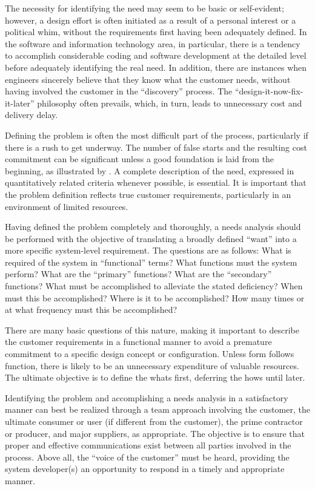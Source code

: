 The necessity for identifying the need may seem to be basic or self-evident; however, a design effort is often initiated as a result of a personal interest or a political whim, without the requirements first having been adequately defined. In the software and information technology area, in particular, there is a tendency to accomplish considerable coding and software development at the detailed level before adequately identifying the real need. In addition, there are instances when engineers sincerely believe that they know what the customer needs, without having involved the customer in the ``discovery'' process. The ``design-it-now-fix-it-later'' philosophy often prevails, which, in turn, leads to unnecessary cost and delivery delay.

Defining the problem is often the most difficult part of the process, particularly if there is a rush to get underway. The number of false starts and the resulting cost commitment can be significant unless a good foundation is laid from the beginning, as illustrated by . A complete description of the need, expressed in quantitatively related criteria whenever possible, is essential. It is important that the problem definition reflects true customer requirements, particularly in an environment of limited resources.

Having defined the problem completely and thoroughly, a needs analysis should be performed with the objective of translating a broadly defined ``want'' into a more specific system-level requirement. The questions are as follows: What is required of the system in ``functional'' terms? What functions must the system perform? What are the ``primary'' functions? What are the ``secondary'' functions? What must be accomplished to alleviate the stated deficiency? When must this be accomplished? Where is it to be accomplished? How many times or at what frequency must this be accomplished?

There are many basic questions of this nature, making it important to describe the customer requirements in a functional manner to avoid a premature commitment to a specific design concept or configuration. Unless form follows function, there is likely to be an unnecessary expenditure of valuable resources. The ultimate objective is to define the whats first, deferring the hows until later.

Identifying the problem and accomplishing a needs analysis in a satisfactory manner can best be realized through a team approach involving the customer, the ultimate consumer or user (if different from the customer), the prime contractor or producer, and major suppliers, as appropriate. The objective is to ensure that proper and effective communications exist between all parties involved in the process. Above all, the ``voice of the customer'' must be heard, providing the system developer(s) an opportunity to respond in a timely and appropriate manner.

